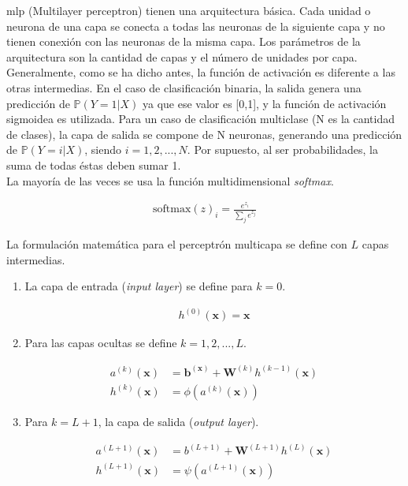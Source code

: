 \indent \acrshort{mlp} (Multilayer perceptron) tienen una arquitectura básica. Cada unidad o neurona de una capa se conecta a todas las neuronas de la siguiente capa y no tienen conexión con las neuronas de la misma capa. Los parámetros de la arquitectura son la cantidad de capas y el número de unidades por capa. Generalmente, como se ha dicho antes, la función de activación es diferente a las otras intermedias. En el caso de clasificación binaria, la salida genera una predicción de $\mathbb{P}(Y=1|X)$ ya que ese valor es [0,1], y la función de activación sigmoidea es utilizada. Para un caso de clasificación multiclase (N es la cantidad de clases), la capa de salida se compone de N neuronas, generando una predicción de $\mathbb{P}(Y=i|X)$, siendo $i=1,2,...,N$. Por supuesto, al ser probabilidades, la suma de todas éstas deben sumar 1. \\
\indent La mayoría de las veces se usa la función multidimensional \textit{softmax}.

\begin{align}
    \mathrm{softmax}(z)_i = \frac{e^{z_i}}{\sum_j e^{z_j}}
\end{align}

\indent La formulación matemática para el perceptrón multicapa se define con $L$ capas intermedias.

\begin{enumerate}
    \item La capa de entrada (\textit{input layer}) se define para $k=0$.
    
    \begin{align*}
        h^{(0)}(\bm{x}) = \bm{x}
    \end{align*}
    
    \item Para las capas ocultas se define $k = 1,2,...,L$.

    \begin{align*}
        a^{(k)}(\bm{x}) &= \bm{b}^{(\bm{x})} + \mathbf{W}^{(k)}h^{(k-1)}(\mathbf{x}) \\
        h^{(k)}(\bm{x}) &= \phi(a^{(k)}(\bm{x}))
    \end{align*}
    
    \item Para $k = L+1$, la capa de salida (\textit{output layer}).

    \begin{align*}
        a^{(L+1)}(\bm{x}) &= b^{(L+1)} + \mathbf{W}^{(L+1)}h^{(L)}(\mathbf{x}) \\
        h^{(L+1)}(\bm{x}) &= \psi(a^{(L+1)}(\bm{x}))
    \end{align*}
\end{enumerate}

